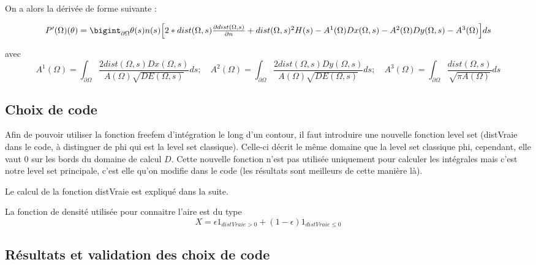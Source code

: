 \documentclass[11pt,a4paper]{article}
\begin{document}
On a alors la dérivée de forme suivante :

\begin{equation}
\begin{array}{l}
P'(\Omega)(\theta)=\bigint_{\partial\Omega}
\theta(s)n(s)\Big[2*dist(\Omega,s)\frac{\partial dist(\Omega,s)}{\partial n}+dist(\Omega,s)^2H(s)-A^1(\Omega)Dx(\Omega,s)-A^2(\Omega)Dy(\Omega,s)-A^3(\Omega)\Big] ds\\
\end{array}
\end{equation}

avec 
\begin{equation}
\label{eq:A1A2A32D}
A^1(\Omega)=\int_{\partial\Omega}\frac{2dist(\Omega,s)Dx(\Omega,s)}{A(\Omega)\sqrt{DE(\Omega,s)}}ds;\quad A^2(\Omega)=\int_{\partial\Omega}\frac{2dist(\Omega,s)Dy(\Omega,s)}{A(\Omega)\sqrt{DE(\Omega,s)}}ds; \quad 
A^3(\Omega)=\int_{\partial\Omega}\frac{dist(\Omega,s)}{\sqrt{\pi A(\Omega)}}ds
\end{equation}

\subsection*{Choix de code}
Afin de pouvoir utiliser la fonction freefem d'intégration le long d'un contour, il faut introduire une nouvelle fonction level set (distVraie dans le code, à distinguer de phi qui est la level set classique). Celle-ci décrit le même domaine que la level set classique phi, cependant, elle vaut 0 sur les bords du domaine de calcul $D$. Cette nouvelle fonction n'est pas utilisée uniquement pour calculer les intégrales mais c'est notre level set principale, c'est elle qu'on modifie dans le code (les résultats sont meilleurs de cette manière là). 

\vspace{0cm}

Le calcul de la fonction distVraie est expliqué dans la suite.

La fonction de densité utilisée pour connaitre l'aire est du type 
\begin{equation}
\label{eq:densite}
X=\epsilon 1_{distVraie>0}+(1-\epsilon)1_{distVraie\leq 0}
\end{equation}

\subsection*{Résultats et validation des choix de code}
\end{document}

